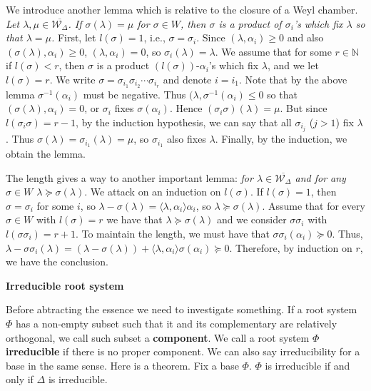 \documentclass{article}
\newcommand{\NaN}{\mathbb{N}}
\begin{document}
We introduce another lemma which is relative to the closure of a Weyl chamber.
\textit{Let $\lambda, \mu \in \overline{\mathcal{W}_\Delta}$.
If $\sigma(\lambda) = \mu$ for $\sigma \in W$, then $\sigma$ is a product of $\sigma_i$'s which fix $\lambda$ so that $\lambda = \mu$.}
First, let $l(\sigma) = 1$, i.e., $\sigma = \sigma_i$.
Since $(\lambda, \alpha_i) \ge 0$ and also $(\sigma(\lambda), \alpha_i) \ge 0$, $(\lambda, \alpha_i) = 0$, so $\sigma_i(\lambda) = \lambda$.
We assume that for some $r \in \NaN$ if $l(\sigma) < r$, then $\sigma$ is a product $(l(\sigma))$-$\alpha_i$'s which fix $\lambda$, and we let $l(\sigma) = r$.
We write $\sigma = \sigma_{i_1} \sigma_{i_2} \cdots \sigma_{i_r}$ and denote $i = i_1$.
Note that by the above lemma $\sigma^{-1}(\alpha_i)$ must be negative.
Thus $(\lambda, \sigma^{-1}(\alpha_i) \le 0$ so that $(\sigma(\lambda), \alpha_i) = 0$, or $\sigma_i$ fixes $\sigma(\alpha_i)$.
Hence $(\sigma_i \sigma)(\lambda) = \mu$.
But since $l(\sigma_i \sigma) = r - 1$, by the induction hypothesis, we can say that all $\sigma_{i_j}$ ($j>1$) fix $\lambda$.
Thus $\sigma(\lambda) = \sigma_{i_1}(\lambda) = \mu$, so $\sigma_{i_1}$ also fixes $\lambda$.
Finally, by the induction, we obtain the lemma.

The length gives a way to another important lemma: \textit{for $\lambda \in \overline{\mathcal{W}_\Delta}$ and for any $\sigma \in W$ $\lambda \succeq \sigma(\lambda)$}.
We attack on an induction on $l(\sigma)$.
If $l(\sigma) = 1$, then $\sigma = \sigma_i$ for some $i$, so $\lambda - \sigma(\lambda) = \langle \lambda, \alpha_i \rangle \alpha_i$, so $\lambda \succeq \sigma(\lambda)$.
Assume that for every $\sigma \in W$ with $l(\sigma) = r$ we have that $\lambda \succeq \sigma(\lambda)$ and we consider $\sigma \sigma_i$ with $l(\sigma \sigma_i) = r + 1$.
To maintain the length, we must have that $\sigma \sigma_i (\alpha_i) \succeq 0$.
Thus, $\lambda - \sigma \sigma_i(\lambda) = (\lambda - \sigma(\lambda)) + \langle \lambda, \alpha_i \rangle \sigma(\alpha_i) \succeq 0$.
Therefore, by induction on $r$, we have the conclusion.

\newpage

\textbf{Irreducible root system}

Before abtracting the essence we need to investigate something.
If a root system $\Phi$ has a non-empty subset such that it and its complementary are relatively orthogonal, we call such subset a \textbf{component}.
We call a root system $\Phi$ \textbf{irreducible} if there is no proper component.
We can also say irreducibility for a base in the same sense.
Here is a theorem.
Fix a base $\Phi$.
$\Phi$ is irreducible if and only if $\Delta$ is irreducible.
\end{document}
